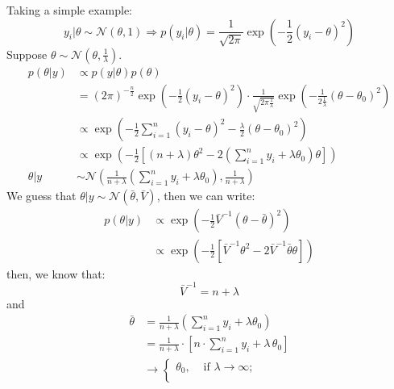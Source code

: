 \begin{eg}
    Taking a simple example: 
    \begin{equation}
        y_i | \theta \sim \mathcal{N} \left( \theta , 1 \right) \Rightarrow p(y_i | \theta) = \frac{1}{\sqrt{2\pi}} \exp \left( -\frac{1}{2} (y_i - \theta)^2 \right)
    \end{equation}
    Suppose $\theta \sim \mathcal{N} \left( \theta , \frac{1}{\lambda } \right)$.
    \begin{align}
        p(\theta | y) & \propto p(y | \theta) p(\theta) \\
        &= (2\pi )^{ -\frac{n}{2}} \exp \left( -\frac{1}{2} (y_i - \theta)^2 \right) \cdot \frac{1}{\sqrt{2\pi \frac{1}{\lambda}}} \exp \left( -\frac{1}{2 \frac{1}{\lambda }} (\theta - \theta_0)^2 \right) \\
        & \propto \exp \left( -\frac{1}{2} \sum_{i=1}^n (y_i - \theta)^2 - \frac{\lambda }{2} (\theta - \theta_0)^2 \right) \\
        & \propto \exp \left( -\frac{1}{2} \left[ (n + \lambda ) \theta^2 - 2 \left(\sum_{i=1}^n y_i + \lambda \theta_0\right) \theta \right] \right) \\
        \theta | y & \sim \mathcal{N} \left( \frac{1}{n + \lambda } \left( \sum_{i=1}^n y_i + \lambda \theta_0 \right), \frac{1}{n + \lambda } \right)
    \end{align}
    We guess that $\theta | y \sim \mathcal{N} \left( \bar{\theta }, \bar{V} \right)$,
    then we can write:
    \begin{align}
        p \left( \theta | y \right) & \propto \exp \left( -\frac{1}{2} \bar{V}^{-1} (\theta - \bar{\theta })^2 \right) \\
        & \propto \exp \left( -\frac{1}{2} \left[ \bar{V}^{-1} \theta^2 - 2 \bar{V}^{-1} \bar{\theta } \theta \right] \right)
    \end{align}
    then, we know that:
    \begin{equation}
        \bar{V}^{-1} = n + \lambda 
    \end{equation}
    and
    \begin{align}
        \bar{\theta } &= \frac{1}{n + \lambda } \left( \sum_{i=1}^n y_i + \lambda \theta_0 \right) \\
        &= \frac{1}{n + \lambda } \cdot \left[ n \cdot \sum_{i=1}^n y_i + \lambda\, \theta_0 \right] \\
        & \to \begin{cases}
            \theta_0, &\text{ if } \lambda \to \infty ; \\

\end{cases}
\end{align}
\end{eg}
